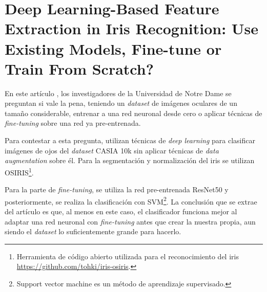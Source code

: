 




\section{Deep Learning-Based Feature Extraction in Iris Recognition: Use Existing Models, Fine-tune or Train From Scratch?}


En este artículo \cite{boyd_deep_2020}, los investigadores de la Universidad de Notre Dame se preguntan si vale la pena, teniendo un \textit{dataset} de imágenes oculares de un tamaño considerable,
entrenar a una red neuronal desde cero o aplicar técnicas de \textit{fine-tuning} sobre una red ya pre-entrenada.

Para contestar a esta pregunta, utilizan técnicas de \textit{deep learning} para clasificar imágenes de ojos del \textit{dataset} CASIA 10k sin aplicar técnicas de \textit{data augmentation} sobre él. 
Para la segmentación y normalización del iris se utilizan OSIRIS\footnote{Herramienta de código abierto utilizada para el reconocimiento del iris \url{https://github.com/tohki/iris-osiris}.}.

Para la parte de \textit{fine-tuning}, se utiliza la red pre-entrenada ResNet50 y posteriormente, se realiza la clasificación con SVM\footnote{Support vector machine es un método de aprendizaje supervisado.}.
La conclusión que se extrae del artículo es que, al menos en este caso, el clasificador funciona mejor al adaptar una red neuronal con \textit{fine-tuning} antes que crear la nuestra propia, aun siendo el 
\textit{dataset} lo suficientemente grande para hacerlo.
